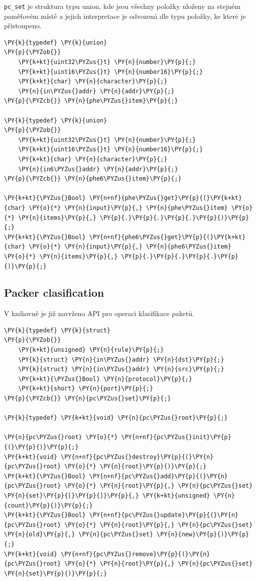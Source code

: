 \texttt{pc\_set} je struktura typu union, kde jsou všechny položky uloženy na stejném paměťovém místě
a jejich interpretace je odvozená dle typu položky, ke které je přistoupeno.

\begin{Verbatim}[commandchars=\\\{\}]
\PY{k}{typedef} \PY{k}{union}
\PY{p}{\PYZob{}}
	\PY{k+kt}{uint32\PYZus{}t} \PY{n}{number}\PY{p}{;}
	\PY{k+kt}{uint16\PYZus{}t} \PY{n}{number16}\PY{p}{;}
	\PY{k+kt}{char} \PY{n}{character}\PY{p}{;}
	\PY{n}{in\PYZus{}addr} \PY{n}{addr}\PY{p}{;}
\PY{p}{\PYZcb{}} \PY{n}{phe\PYZus{}item}\PY{p}{;}

\PY{k}{typedef} \PY{k}{union}
\PY{p}{\PYZob{}}
	\PY{k+kt}{uint32\PYZus{}t} \PY{n}{number}\PY{p}{;}
	\PY{k+kt}{uint16\PYZus{}t} \PY{n}{number16}\PY{p}{;}
	\PY{k+kt}{char} \PY{n}{character}\PY{p}{;}
	\PY{n}{in6\PYZus{}addr} \PY{n}{addr}\PY{p}{;}
\PY{p}{\PYZcb{}} \PY{n}{phe6\PYZus{}item}\PY{p}{;}

\PY{k+kt}{\PYZus{}Bool} \PY{n+nf}{phe\PYZus{}get}\PY{p}{(}\PY{k+kt}{char} \PY{o}{*} \PY{n}{input}\PY{p}{,} \PY{n}{phe\PYZus{}item} \PY{o}{*} \PY{n}{items}\PY{p}{,} \PY{p}{.}\PY{p}{.}\PY{p}{.}\PY{p}{)}\PY{p}{;}
\PY{k+kt}{\PYZus{}Bool} \PY{n+nf}{phe6\PYZus{}get}\PY{p}{(}\PY{k+kt}{char} \PY{o}{*} \PY{n}{input}\PY{p}{,} \PY{n}{phe6\PYZus{}item} \PY{o}{*} \PY{n}{items}\PY{p}{,} \PY{p}{.}\PY{p}{.}\PY{p}{.}\PY{p}{)}\PY{p}{;}
\end{Verbatim}


\subsection{Packer clasification}
V knihovně je již navrženo API pro operaci klasifikace paketů.

\begin{Verbatim}[commandchars=\\\{\}]
\PY{k}{typedef} \PY{k}{struct}
\PY{p}{\PYZob{}}
	\PY{k+kt}{unsigned} \PY{n}{rule}\PY{p}{;}
	\PY{k}{struct} \PY{n}{in\PYZus{}addr} \PY{n}{dst}\PY{p}{;}
	\PY{k}{struct} \PY{n}{in\PYZus{}addr} \PY{n}{src}\PY{p}{;}
	\PY{k+kt}{\PYZus{}Bool} \PY{n}{protocol}\PY{p}{;}
	\PY{k+kt}{short} \PY{n}{port}\PY{p}{;}
\PY{p}{\PYZcb{}} \PY{n}{pc\PYZus{}set}\PY{p}{;}

\PY{k}{typedef} \PY{k+kt}{void} \PY{n}{pc\PYZus{}root}\PY{p}{;}

\PY{n}{pc\PYZus{}root} \PY{o}{*} \PY{n+nf}{pc\PYZus{}init}\PY{p}{(}\PY{p}{)}\PY{p}{;}
\PY{k+kt}{void} \PY{n+nf}{pc\PYZus{}destroy}\PY{p}{(}\PY{n}{pc\PYZus{}root} \PY{o}{*} \PY{n}{root}\PY{p}{)}\PY{p}{;}
\PY{k+kt}{\PYZus{}Bool} \PY{n+nf}{pc\PYZus{}add}\PY{p}{(}\PY{n}{pc\PYZus{}root} \PY{o}{*} \PY{n}{root}\PY{p}{,} \PY{n}{pc\PYZus{}set} \PY{n}{set}\PY{p}{[}\PY{p}{]}\PY{p}{,} \PY{k+kt}{unsigned} \PY{n}{count}\PY{p}{)}\PY{p}{;}
\PY{k+kt}{\PYZus{}Bool} \PY{n+nf}{pc\PYZus{}update}\PY{p}{(}\PY{n}{pc\PYZus{}root} \PY{o}{*} \PY{n}{root}\PY{p}{,} \PY{n}{pc\PYZus{}set} \PY{n}{old}\PY{p}{,} \PY{n}{pc\PYZus{}set} \PY{n}{new}\PY{p}{)}\PY{p}{;}
\PY{k+kt}{void} \PY{n+nf}{pc\PYZus{}remove}\PY{p}{(}\PY{n}{pc\PYZus{}root} \PY{o}{*} \PY{n}{root}\PY{p}{,} \PY{n}{pc\PYZus{}set} \PY{n}{set}\PY{p}{)}\PY{p}{;}
\end{Verbatim}




